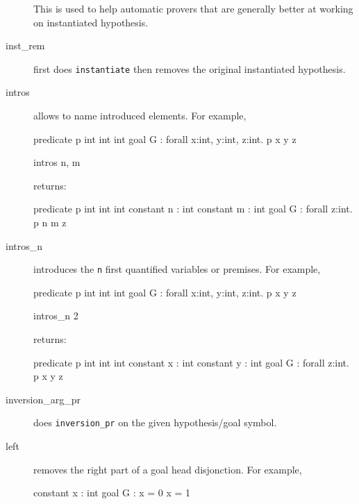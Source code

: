 \begin{description}
This is used to help automatic provers that are generally better at working on
instantiated hypothesis.


\item[inst\_rem] first does \texttt{instantiate} then removes the original
  instantiated hypothesis.


\item[intros] allows to name introduced elements.
  For example,
\begin{whycode}
predicate p int int int
goal G : forall x:int, y:int, z:int. p x y z
\end{whycode}

\begin{transwhy3}
intros n, m
\end{transwhy3}

returns:
\begin{whycode}
predicate p int int int
constant n : int
constant m : int
goal G : forall z:int. p n m z
\end{whycode}


\item[intros\_n] introduces the \texttt{n} first quantified variables or
  premises.
  For example,
\begin{whycode}
predicate p int int int
goal G : forall x:int, y:int, z:int. p x y z
\end{whycode}

\begin{transwhy3}
intros_n 2
\end{transwhy3}

returns:

\begin{whycode}
predicate p int int int
constant x : int
constant y : int
goal G : forall z:int. p x y z
\end{whycode}


\item[inversion\_arg\_pr] does \texttt{inversion\_pr} on the given
  hypothesis/goal symbol.


\item[left] removes the right part of a goal head disjonction.
  For example,
\begin{whycode}
constant x : int
goal G : x = 0 \/ x = 1
\end{whycode}


\end{description}
